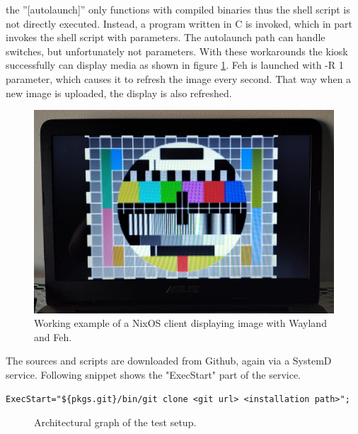 the ''[autolaunch]'' only functions with compiled binaries thus the
shell script is not directly executed. Instead, a program written in C
is invoked, which in part invokes the shell script with
parameters. The autolaunch path can handle switches, but unfortunately
not parameters. With these workarounds the kiosk successfully can
display media as shown in figure \ref{testimage}. Feh is launched with
-R 1 parameter, which causes it to refresh the image every
second. That way when a new image is uploaded, the display is also
refreshed.

\begin{figure}
    \centering \includegraphics[scale=0.2]{latex/kuvat/testimage.jpeg}
    \caption{Working example of a NixOS client displaying image with
      Wayland and Feh.}
    \label{testimage}
\end{figure}

The sources and scripts are downloaded from Github, again via a
SystemD service. Following snippet shows the "ExecStart" part of the
service.

\begin{lstlisting}
ExecStart="${pkgs.git}/bin/git clone <git url> <installation path>";
\end{lstlisting}


\begin{figure}

\caption{Architectural graph of the test setup.}
\label{parchitecture}
\end{figure}

